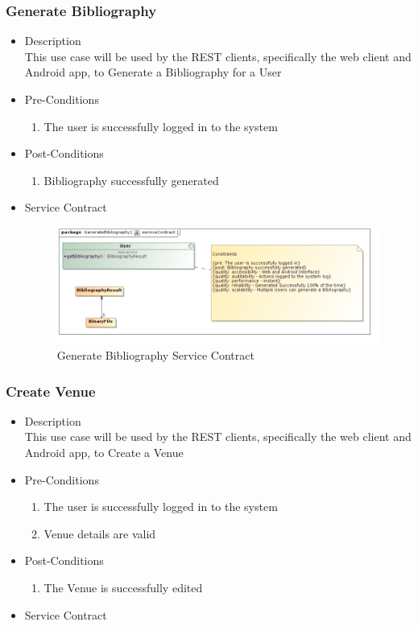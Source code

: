 \documentclass[a4paper,10pt]{article}
\begin{document}
\subsubsection{Generate Bibliography}
	\begin{itemize}
		\item Description\\
			This use case will be used by the REST clients, specifically the web client and Android app, to Generate a Bibliography for a User
		\item Pre-Conditions
			\begin{enumerate}
				\item The user is successfully logged in to the system
			\end{enumerate}
		\item Post-Conditions
			\begin{enumerate}
				\item Bibliography successfully generated
						
			\end{enumerate}
		\item Service Contract
			\begin{figure}[H]
				\includegraphics[scale=0.5]{generateBibliography}
				\caption{Generate Bibliography Service Contract}
			\end{figure}
	\end{itemize}


\subsubsection{Create Venue}
	\begin{itemize}
		\item Description\\
			This use case will be used by the REST clients, specifically the web client and Android app, to Create a Venue
		\item Pre-Conditions
			\begin{enumerate}
				\item The user is successfully logged in to the system
				\item Venue details are valid
			\end{enumerate}
		\item Post-Conditions
			\begin{enumerate}
				\item The Venue is successfully edited
						
			\end{enumerate}
		\item Service Contract
	\end{itemize}
\end{document}
